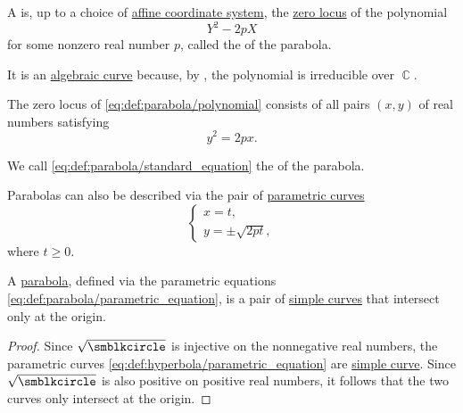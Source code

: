 \begin{definition}\label{def:parabola}
  A  is, up to a choice of \hyperref[def:affine_coordinate_system]{affine coordinate system}, the \hyperref[def:zero_locus]{zero locus} of the polynomial
  \begin{equation}\label{eq:def:parabola/polynomial}
    Y^2 - 2p X
  \end{equation}
  for some nonzero real number \( p \), called the  of the parabola.

  It is an \hyperref[def:affine_algebraic_set/curve]{algebraic curve} because, by , the polynomial is irreducible over \( \BbbC \).

  \begin{thmenum}
     The zero locus of \eqref{eq:def:parabola/polynomial} consists of all pairs \( (x, y) \) of real numbers satisfying
    \begin{equation}\label{eq:def:parabola/standard_equation}
      y^2 = 2px.
    \end{equation}

    We call \eqref{eq:def:parabola/standard_equation} the  of the parabola.

     Parabolas can also be described via the pair of \hyperref[def:parametric_curve]{parametric curves}
    \begin{equation}\label{eq:def:parabola/parametric_equation}
      \begin{cases}
        x = t, \\
        y = \pm \sqrt{ 2pt },
      \end{cases}
    \end{equation}
    where \( t \geq 0 \).
  \end{thmenum}
\end{definition}

\begin{proposition}\label{thm:parabola_is_closed_simple_curve}
  A \hyperref[def:parabola]{parabola}, defined via the parametric equations \eqref{eq:def:parabola/parametric_equation}, is a pair of \hyperref[def:parametric_curve/simple]{simple curves} that intersect only at the origin.
\end{proposition}
\begin{proof}
  Since \( \sqrt {\anon} \) is injective on the nonnegative real numbers, the parametric curves \eqref{eq:def:hyperbola/parametric_equation} are \hyperref[def:parametric_curve/simple]{simple curve}. Since \( \sqrt {\anon} \) is also positive on positive real numbers, it follows that the two curves only intersect at the origin.
\end{proof}

